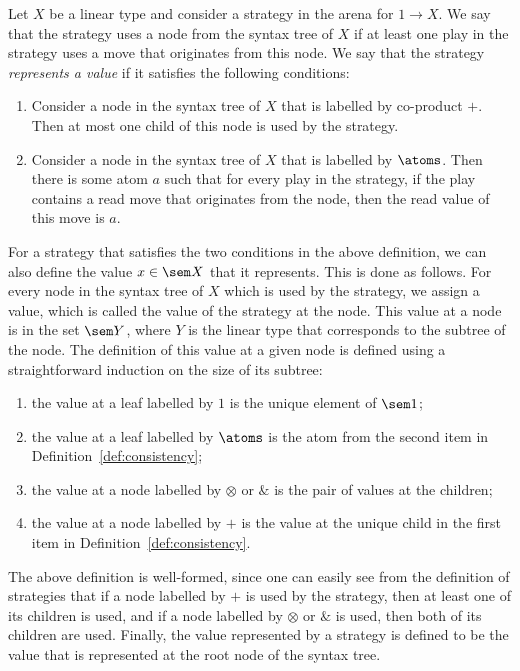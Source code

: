 \begin{definition}\label{def:consistency}
    Let $X$ be a linear type and consider a  strategy in  the arena for $1 \to X$. We say that the strategy uses a node from the syntax tree of $X$ if at least one play in the strategy uses a move that originates from this node. We say that the  strategy    \emph{represents a value} if it satisfies the following conditions: 
    \begin{enumerate}
        \item Consider a node in  the syntax tree of $X$ that is labelled by co-product $+$. Then at most one child of this node is  used by the strategy. 
        \item Consider a node  in the syntax tree of $X$ that  is labelled by $\atoms$. Then there is some atom $a$ such that for every play in the strategy, if the play contains a read move that originates from the node, then the read value of this move is $a$. 
    \end{enumerate}
\end{definition}

For a strategy that satisfies the two conditions in the above definition, we can also define the value $x \in \sem X$ that it represents.  This is done as follows.  For every node  in the syntax tree  of $X$ which is used by the strategy, we assign a value, which is called the value of the strategy at the node. This value at a node is in the set $\sem Y$, where $Y$ is the linear type that corresponds to the subtree of the node.  The definition of this value at a given node  is defined using a straightforward induction on the size of its subtree: 
\begin{enumerate}
    \item the value at a leaf labelled by $1$ is the unique element of $\sem 1$;
    \item the value at a leaf labelled by $\atoms$ is the atom from the second item in Definition~\ref{def:consistency};
    \item the value at a node labelled by $\otimes$ or $\&$ is the pair of values at the children;
    \item the value at a node labelled by $+$ is the value at  the unique child in the first item in Definition~\ref{def:consistency}.
\end{enumerate}
The above definition is well-formed, since one can easily see from the definition of strategies that if a node labelled by $+$ is used by the strategy, then at least one of its children is used, and if a node labelled by $\otimes$ or $\&$ is used, then both of its children are used. Finally, the value represented by a strategy is defined to be the value that is represented at the root node of the syntax tree. 

